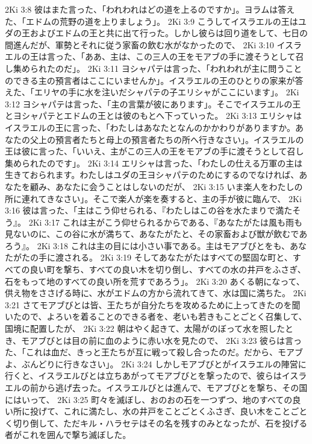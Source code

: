 2Ki 3:8  彼はまた言った、「われわれはどの道を上るのですか」。ヨラムは答えた、「エドムの荒野の道を上りましょう」。
2Ki 3:9  こうしてイスラエルの王はユダの王およびエドムの王と共に出て行った。しかし彼らは回り道をして、七日の間進んだが、軍勢とそれに従う家畜の飲む水がなかったので、
2Ki 3:10  イスラエルの王は言った、「ああ、主は、この三人の王をモアブの手に渡そうとして召し集められたのだ」。
2Ki 3:11  ヨシャパテは言った、「われわれが主に問うことのできる主の預言者はここにいませんか」。イスラエルの王のひとりの家来が答えた、「エリヤの手に水を注いだシャパテの子エリシャがここにいます」。
2Ki 3:12  ヨシャパテは言った、「主の言葉が彼にあります」。そこでイスラエルの王とヨシャパテとエドムの王とは彼のもとへ下っていった。
2Ki 3:13  エリシャはイスラエルの王に言った、「わたしはあなたとなんのかかわりがありますか。あなたの父上の預言者たちと母上の預言者たちの所へ行きなさい」。イスラエルの王は彼に言った、「いいえ、主がこの三人の王をモアブの手に渡そうとして召し集められたのです」。
2Ki 3:14  エリシャは言った、「わたしの仕える万軍の主は生きておられます。わたしはユダの王ヨシャパテのためにするのでなければ、あなたを顧み、あなたに会うことはしないのだが、
2Ki 3:15  いま楽人をわたしの所に連れてきなさい」。そこで楽人が楽を奏すると、主の手が彼に臨んで、
2Ki 3:16  彼は言った、「主はこう仰せられる、『わたしはこの谷を水たまりで満たそう』。
2Ki 3:17  これは主がこう仰せられるからである、『あなたがたは風も雨も見ないのに、この谷に水が満ちて、あなたがたと、その家畜および獣が飲むであろう』。
2Ki 3:18  これは主の目には小さい事である。主はモアブびとをも、あなたがたの手に渡される。
2Ki 3:19  そしてあなたがたはすべての堅固な町と、すべての良い町を撃ち、すべての良い木を切り倒し、すべての水の井戸をふさぎ、石をもって地のすべての良い所を荒すであろう」。
2Ki 3:20  あくる朝になって、供え物をささげる時に、水がエドムの方から流れてきて、水は国に満ちた。
2Ki 3:21  さてモアブびとは皆、王たちが自分たちを攻めるために上ってきたのを聞いたので、よろいを着ることのできる者を、老いも若きもことごとく召集して、国境に配置したが、
2Ki 3:22  朝はやく起きて、太陽がのぼって水を照したとき、モアブびとは目の前に血のように赤い水を見たので、
2Ki 3:23  彼らは言った、「これは血だ、きっと王たちが互に戦って殺し合ったのだ。だから、モアブよ、ぶんどりに行きなさい」。
2Ki 3:24  しかしモアブびとがイスラエルの陣営に行くと、イスラエルびとは立ちあがってモアブびとを撃ったので、彼らはイスラエルの前から逃げ去った。イスラエルびとは進んで、モアブびとを撃ち、その国にはいって、
2Ki 3:25  町々を滅ぼし、おのおの石を一つずつ、地のすべての良い所に投げて、これに満たし、水の井戸をことごとくふさぎ、良い木をことごとく切り倒して、ただキル・ハラセテはその名を残すのみとなったが、石を投げる者がこれを囲んで撃ち滅ぼした。
